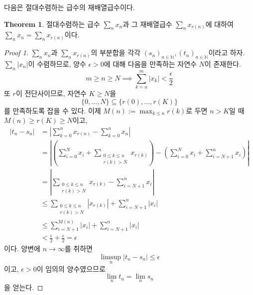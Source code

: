 \documentclass[11pt]{book}
\numberwithin{equation}{chapter}
\def\NN{\mathbb{N}}
\def\eps{\epsilon}
\newcommand{\abs}[1]{\left\vert#1\right\vert}
\newcommand{\paren}[1]{\left(#1\right)}
\theoremstyle{definition}
\newtheorem{thm}{Theorem}[section]
\begin{document}
다음은 절대수렴하는 급수의 재배열급수이다.

\begin{thm}
    절대수렴하는 급수 \(\sum_n x_n\)과 그 재배열급수 \(\sum_n x_{r(n)}\)에 대하여 \(\sum_n x_n = \sum_n x_{r(n)}\)이다.
\end{thm}
\begin{proof} [Proof 1]
    \(\sum_n x_n\)과 \(\sum_n x_{r(n)}\)의 부분합을 각각 \((s_n)_{n \in \NN}, (t_n)_{n \in \NN}\)이라고 하자. \(\sum_n \abs{x_n}\)이 수렴하므로, 양수 \(\eps > 0\)에 대해 다음을 만족하는 자연수 \(N\)이 존재한다.
    \[
    m \ge n \ge N \implies \sum_{k=n}^m \abs{x_k} < \frac{\eps}{2} 
    \]
    또 \(r\)이 전단사이므로, 자연수 \(K \ge N\)을
    \[
    \{0, \ldots, N\} \subseteq \{r(0), \ldots, r(K)\}    
    \]
    를 만족하도록 잡을 수 있다. 이제 \(M(n) := \max_{k \le n} r(k)\)로 두면 \(n > K\)일 때 \(M(n) \ge r(K) \ge N\)이고,
    \begin{align*}
        \abs{t_n - s_n} &= \abs{\sum_{k=0}^n x_{r(n)} - \sum_{k=0}^n x_n}\\
        &= \abs{\paren{\sum_{i=0}^N x_i + \sum_{\substack{0 \le k \le n \\ r(k) > N}} x_{r(k)}} - \paren{\sum_{i=0}^N x_i + \sum_{i=N+1}^n x_i}}\\
        &= \abs{\sum_{\substack{0 \le k \le n \\ r(k) > N}} x_{r(k)} -  \sum_{i=N+1}^n x_i}\\
        &\le \sum_{\substack{0 \le k \le n \\ r(k) > N}} \abs{x_{r(k)} } + \sum_{i=N+1}^n \abs{x_i}\\
        &\le \sum_{i=N+1}^{M(n)} \abs{x_i} + \sum_{i=N+1}^n \abs{x_i}\\
        &< \frac{\eps}{2} + \frac{\eps}{2 } = \eps
    \end{align*}
    이다. 양변에 \(n \to \infty\)를 취하면
    \[
    \limsup_n \abs{t_n - s_n} \le \eps    
    \]
    이고, \(\eps  > 0\)이 임의의 양수였으므로
    \[
    \lim_n t_n = \lim_n s_n    
    \]
    을 얻는다.
\end{proof}
\end{document}
